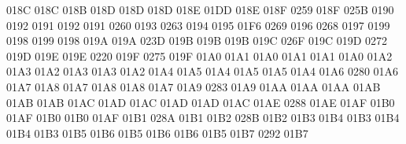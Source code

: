 \setcclcuc 018C 018C 018B %
\setcclcuc 018D 018D 018D %
\setcclcuc 018E 01DD 018E %
\setcclcuc 018F 0259 018F %
 025B 0190 %
 0192 0191 %
 0192 0191 %
 0260 0193 %
 0263 0194 %
 0195 01F6 %
 0269 0196 %
 0268 0197 %
 0199 0198 %
 0199 0198 %
\setcclcuc 019A 019A 023D %
\setcclcuc 019B 019B 019B %
\setcclcuc 019C 026F 019C %
\setcclcuc 019D 0272 019D %
\setcclcuc 019E 019E 0220 %
\setcclcuc 019F 0275 019F %
\setcclcuc 01A0 01A1 01A0 %
\setcclcuc 01A1 01A1 01A0 %
\setcclcuc 01A2 01A3 01A2 %
\setcclcuc 01A3 01A3 01A2 %
\setcclcuc 01A4 01A5 01A4 %
\setcclcuc 01A5 01A5 01A4 %
\setcclcuc 01A6 0280 01A6 %
\setcclcuc 01A7 01A8 01A7 %
\setcclcuc 01A8 01A8 01A7 %
\setcclcuc 01A9 0283 01A9 %
\setcclcuc 01AA 01AA 01AA %
\setcclcuc 01AB 01AB 01AB %
\setcclcuc 01AC 01AD 01AC %
\setcclcuc 01AD 01AD 01AC %
\setcclcuc 01AE 0288 01AE %
\setcclcuc 01AF 01B0 01AF %
\setcclcuc 01B0 01B0 01AF %
\setcclcuc 01B1 028A 01B1 %
\setcclcuc 01B2 028B 01B2 %
\setcclcuc 01B3 01B4 01B3 %
\setcclcuc 01B4 01B4 01B3 %
\setcclcuc 01B5 01B6 01B5 %
\setcclcuc 01B6 01B6 01B5 %
\setcclcuc 01B7 0292 01B7 %
